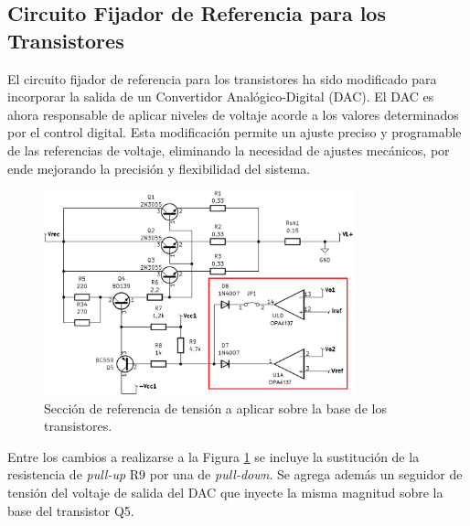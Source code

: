 \subsection{Circuito Fijador de Referencia para los Transistores}
El circuito fijador de referencia para los transistores ha sido modificado para incorporar la salida de un Convertidor Analógico-Digital (DAC). El DAC es ahora responsable de aplicar niveles de voltaje acorde a los valores determinados por el control digital. Esta modificación permite un ajuste preciso y programable de las referencias de voltaje, eliminando la necesidad de ajustes mecánicos, por ende mejorando la precisión y flexibilidad del sistema.\par
\begin{figure}[H]
    \centering
    \includegraphics[width=0.8\textwidth]{./imagenes/Eliminada1.PNG}
    \caption{Sección de referencia de tensión a aplicar sobre la base de los transistores.}
    \label{F:Eliminada1}
\end{figure}\par 
Entre los cambios a realizarse a la Figura \ref{F:Eliminada1} se incluye la sustitución de la resistencia de \textit{pull-up} R9 por una de \textit{pull-down}. Se agrega además un seguidor de tensión del voltaje de salida del DAC que inyecte la misma magnitud sobre la base del transistor Q5.\par

